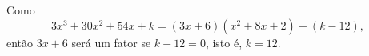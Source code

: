 Como
\[
	3x^3+30x^2+54x+k=(3x+6)(x^2+8x+2)+(k-12),
\]
então $3x+6$ será um fator se $k-12=0$, isto é, $k=12.$
